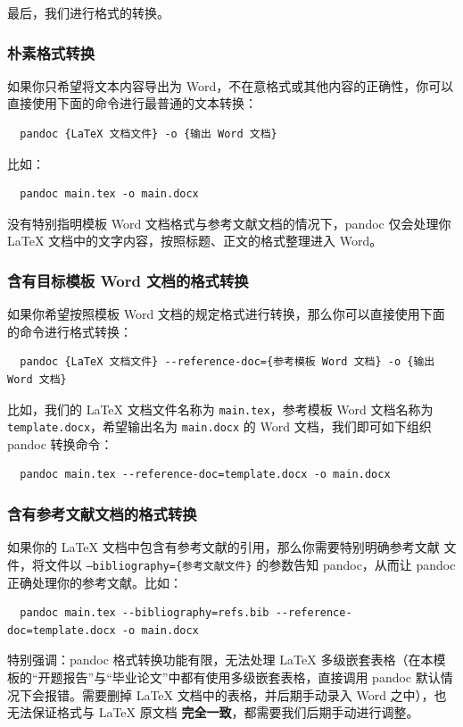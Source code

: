 最后，我们进行格式的转换。

\subsubsection{朴素格式转换}

如果你只希望将文本内容导出为 Word，不在意格式或其他内容的正确性，你可以直接使用下面的命令进行最普通的文本转换：

\begin{verbatim}
  pandoc {LaTeX 文档文件} -o {输出 Word 文档}
\end{verbatim}

比如：

\begin{verbatim}
  pandoc main.tex -o main.docx
\end{verbatim}

没有特别指明模板 Word 文档格式与参考文献文档的情况下，pandoc 仅会处理你 {\LaTeX} 文档中的文字内容，按照标题、正文的格式整理进入 Word。

\subsubsection{含有目标模板 Word 文档的格式转换}

如果你希望按照模板 Word 文档的规定格式进行转换，那么你可以直接使用下面的命令进行格式转换：

\begin{verbatim}
  pandoc {LaTeX 文档文件} --reference-doc={参考模板 Word 文档} -o {输出 Word 文档}
\end{verbatim}

比如，我们的 {\LaTeX} 文档文件名称为 \texttt{main.tex}，参考模板 Word 文档名称为 \texttt{template.docx}，希望输出名为 \texttt{main.docx} 的 Word 文档，我们即可如下组织 pandoc 转换命令：

\begin{verbatim}
  pandoc main.tex --reference-doc=template.docx -o main.docx
\end{verbatim}

\subsubsection{含有参考文献文档的格式转换}

如果你的 LaTeX 文档中包含有参考文献的引用，那么你需要特别明确参考文献  文件，将文件以 \texttt{--bibliography=\{参考文献文件\}} 的参数告知 pandoc，从而让 pandoc 正确处理你的参考文献。比如：

\begin{verbatim}
  pandoc main.tex --bibliography=refs.bib --reference-doc=template.docx -o main.docx
\end{verbatim}

特别强调：pandoc 格式转换功能有限，无法处理 {\LaTeX} 多级嵌套表格（在本模板的“开题报告”与“毕业论文”中都有使用多级嵌套表格，直接调用 pandoc 默认情况下会报错。需要删掉 {\LaTeX} 文档中的表格，并后期手动录入 Word 之中），也无法保证格式与 {\LaTeX} 原文档 \textbf{完全一致}，都需要我们后期手动进行调整。

